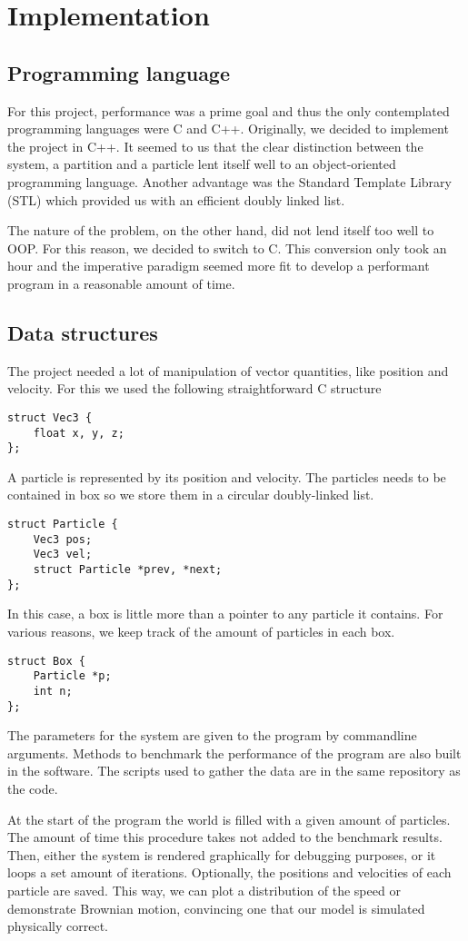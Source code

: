 \section{Implementation}

\subsection{Programming language}
For this project, performance was a prime goal and thus the only contemplated 
programming languages were C and C++.  Originally, we decided to implement the 
project in C++. It seemed to us that the clear distinction between the system, 
a partition and a particle lent itself well to an object-oriented programming 
language. Another advantage was the Standard Template Library (STL) which 
provided us with an efficient doubly linked list.

The nature of the problem, on the other hand, did not lend itself too well to 
OOP. For this reason, we decided to switch to C. This conversion only took an 
hour and the imperative paradigm seemed more fit to develop a performant 
program in a reasonable amount of time.

\subsection{Data structures}

The project needed a lot of manipulation of vector quantities, like position 
and velocity. For this we used the following straightforward C structure

\begin{lstlisting}
struct Vec3 {
	float x, y, z;
};
\end{lstlisting}

A particle is represented by its position and velocity. The particles needs to 
be contained in box so we store them in a circular doubly-linked list.
\begin{lstlisting}
struct Particle {
	Vec3 pos;
	Vec3 vel;
	struct Particle *prev, *next;
};
\end{lstlisting}
In this case, a box is little more than a pointer to any particle it contains.  
For various reasons, we keep track of the amount of particles in each box.
\begin{lstlisting}
struct Box {
	Particle *p;
	int n;
};
\end{lstlisting}

The parameters for the system are given to the program by commandline 
arguments. Methods to benchmark the performance of the program are also built 
in the software. The scripts used to gather the data are in the same repository 
as the code.

At the start of the program the world is filled with a given amount of 
particles. The amount of time this procedure takes not added to the benchmark 
results.  Then, either the system is rendered graphically for debugging 
purposes, or it loops a set amount of iterations. Optionally, the positions and 
velocities of each particle are saved. This way, we can plot a distribution of 
the speed or demonstrate Brownian motion, convincing one that our model is 
simulated physically correct.
